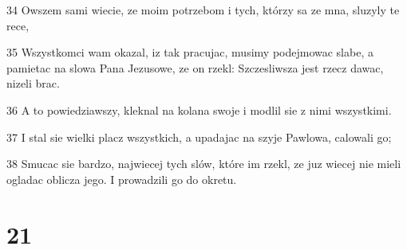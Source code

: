\par 34 Owszem sami wiecie, ze moim potrzebom i tych, którzy sa ze mna, sluzyly te rece,
\par 35 Wszystkomci wam okazal, iz tak pracujac, musimy podejmowac slabe, a pamietac na slowa Pana Jezusowe, ze on rzekl: Szczesliwsza jest rzecz dawac, nizeli brac.
\par 36 A to powiedziawszy, kleknal na kolana swoje i modlil sie z nimi wszystkimi.
\par 37 I stal sie wielki placz wszystkich, a upadajac na szyje Pawlowa, calowali go;
\par 38 Smucac sie bardzo, najwiecej tych slów, które im rzekl, ze juz wiecej nie mieli ogladac oblicza jego. I prowadzili go do okretu.

\chapter{21}

